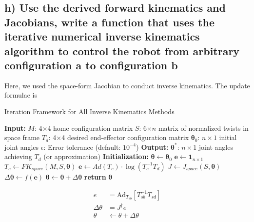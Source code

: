 \documentclass[english,10pt,a4paper]{book}
\begin{document}
    \subsection*{h) Use the derived forward kinematics and Jacobians, write a function that uses the iterative numerical inverse kinematics algorithm to control the robot from arbitrary configuration a to configuration b}
    Here, we used the space-form Jacobian to conduct inverse kinematics. The update formulae is
    \begin{algorithm}[H]
    	\caption{Iteration Framework for All Inverse Kinematics Methods}
    	\label{alg:dls_ik}
    	\begin{algorithmic}[1]
    		\State \textbf{Input:} 
    		\State \quad $M$: 4$\times$4 home configuration matrix
    		\State \quad $S$: 6$\times n$ matrix of normalized twists in space frame
    		\State \quad $T_d$: 4$\times$4 desired end-effector configuration matrix
    		\State \quad $\mathbf{\theta}_0$: $n\times 1$ initial joint angles
    		\State \quad $\epsilon$: Error tolerance (default: $10^{-4}$)
    		\State \textbf{Output:} 
    		\State \quad $\mathbf{\theta}^*$: $n\times 1$ joint angles achieving $T_d$ (or approximation)
    		\State 
    		\State \textbf{Initialization:}
    		\State $\mathbf{\theta} \gets \mathbf{\theta}_0$ 
    		\State $\mathbf{e} \gets \mathbf{1}_{n \times 1}$ 
    		 
    		\State $T_c \gets FK_{space}(M, S, \mathbf{\theta})$ 
    		\State $\mathbf{e} \gets Ad(T_c) \cdot \log(T_c^{-1} T_d)$ 
    		\State $J \gets J_{space}(S, \mathbf{\theta})$ 
    		\State $\Delta \mathbf{\theta} \gets f(\mathbf{e})$ 
    		\State $\mathbf{\theta} \gets \mathbf{\theta} + \Delta \mathbf{\theta}$ 
    		\EndWhile
    		\State \textbf{return} $\mathbf{\theta}$ 
    	\end{algorithmic}
    \end{algorithm}
    \begin{align}
        e &= \text{Ad}_{T_{sb}} [T_{sb}^{-1}  T_{sd}]\\ \nonumber
        \Delta\theta &= J^\dagger e \\ \nonumber
        \theta &\leftarrow \theta + \Delta\theta \nonumber
    \end{align}
\end{document}
